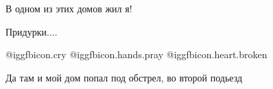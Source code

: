 В одном из этих домов жил я!

 
Придурки....


@igg{fbicon.cry}
@igg{fbicon.hands.pray}
@igg{fbicon.heart.broken}





 
Да там и мой дом попал под обстрел, во второй подьезд


